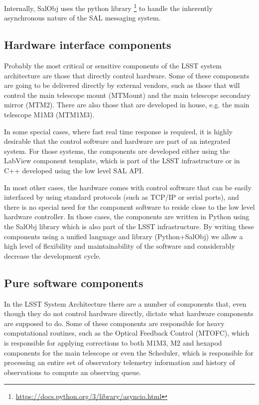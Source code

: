 Internally, SalObj uses the python library \asyncio\footnote{\url{https://docs.python.org/3/library/asyncio.html}} to handle the 
inherently asynchronous nature of the SAL messaging system.

\subsection{Hardware interface components}\label{sect:hardware_csc}
Probably the most critical or sensitive components of the LSST system architecture are those that directly control hardware. Some 
of these components are going to be delivered directly by external vendors, such as those that will control the main telescope 
mount (MTMount) and the main telescope secondary mirror (MTM2). There are also those that are developed in house, e.g. the 
main telescope M1M3 (MTM1M3).

In some special cases, where fast real time response is required, it is highly desirable that the control software and hardware are part 
of an integrated system. For those systems, the components are developed either using the LabView component template, which is 
part of the LSST infrastructure or in C++ developed using the low level SAL API.

In most other cases, the hardware comes with control software that can be easily interfaced by using standard protocols (such as 
TCP/IP or serial ports), and there is no special need for the component software to reside close to the low level hardware controller. 
In those cases, the components are written in Python using the SalObj library which is also part of the LSST infrastructure. By 
writing these components using a unified language and library (Python+SalObj) we allow a high level of flexibility and 
maintainability of the software and considerably decrease the development cycle.

\subsection{Pure software components}\label{sect:software_csc}
In the LSST System Architecture there are a number of components that, even though they do not control hardware directly, dictate 
what hardware components are supposed to do. Some of these components are responsible for heavy computational routines, 
such as the Optical Feedback Control (MTOFC), which is responsible for applying corrections to both M1M3, M2 and 
hexapod components for the main telescope or even the Scheduler, which is responsible for processing an entire set of 
observatory telemetry information and history of observations to compute an observing queue.

